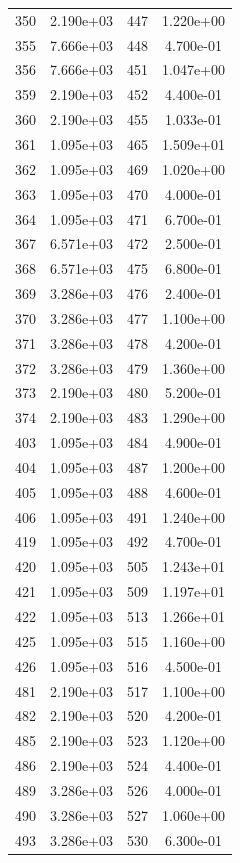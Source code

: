 \documentclass[12pt]{article}
\begin{document}
\begin{longtable}{@{}cccc@{}}
350 & 2.190e+03 & 447 & 1.220e+00 \\
355 & 7.666e+03 & 448 & 4.700e-01 \\
356 & 7.666e+03 & 451 & 1.047e+00 \\
359 & 2.190e+03 & 452 & 4.400e-01 \\
360 & 2.190e+03 & 455 & 1.033e-01 \\
361 & 1.095e+03 & 465 & 1.509e+01 \\
362 & 1.095e+03 & 469 & 1.020e+00 \\
363 & 1.095e+03 & 470 & 4.000e-01 \\
364 & 1.095e+03 & 471 & 6.700e-01 \\
367 & 6.571e+03 & 472 & 2.500e-01 \\
368 & 6.571e+03 & 475 & 6.800e-01 \\
369 & 3.286e+03 & 476 & 2.400e-01 \\
370 & 3.286e+03 & 477 & 1.100e+00 \\
371 & 3.286e+03 & 478 & 4.200e-01 \\
372 & 3.286e+03 & 479 & 1.360e+00 \\
373 & 2.190e+03 & 480 & 5.200e-01 \\
374 & 2.190e+03 & 483 & 1.290e+00 \\
403 & 1.095e+03 & 484 & 4.900e-01 \\
404 & 1.095e+03 & 487 & 1.200e+00 \\
405 & 1.095e+03 & 488 & 4.600e-01 \\
406 & 1.095e+03 & 491 & 1.240e+00 \\
419 & 1.095e+03 & 492 & 4.700e-01 \\
420 & 1.095e+03 & 505 & 1.243e+01 \\
421 & 1.095e+03 & 509 & 1.197e+01 \\
422 & 1.095e+03 & 513 & 1.266e+01 \\
425 & 1.095e+03 & 515 & 1.160e+00 \\
426 & 1.095e+03 & 516 & 4.500e-01 \\
481 & 2.190e+03 & 517 & 1.100e+00 \\
482 & 2.190e+03 & 520 & 4.200e-01 \\
485 & 2.190e+03 & 523 & 1.120e+00 \\
486 & 2.190e+03 & 524 & 4.400e-01 \\
489 & 3.286e+03 & 526 & 4.000e-01 \\
490 & 3.286e+03 & 527 & 1.060e+00 \\
493 & 3.286e+03 & 530 & 6.300e-01 \\

\end{longtable}
\end{document}

